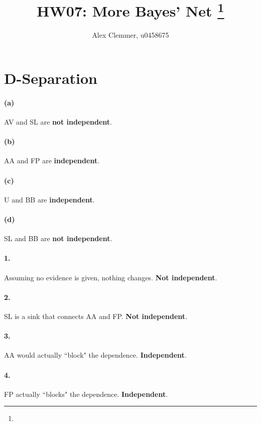 \documentclass[11pt]{article}
\title{HW07: More Bayes' Net
\footnote{\s{CS 5300 AI; \;\; Spring 2012 \hfill
Instructor: Jur van den Berg, University of Utah}
}
}
\author{Alex Clemmer, u0458675}
\begin{document}
\maketitle





\section{D-Separation}

\paragraph{(a)} AV and SL are \textbf{not independent}.

\paragraph{(b)} AA and FP are \textbf{independent}.

\paragraph{(c)} U and BB are \textbf{independent}.

\paragraph{(d)} SL and BB are \textbf{not independent}.


\paragraph{1.} Assuming no evidence is given, nothing changes. \textbf{Not independent}.

\paragraph{2.} SL is a sink that connects AA and FP. \textbf{Not independent}.

\paragraph{3.} AA would actually ``block" the dependence. \textbf{Independent}.

\paragraph{4.} FP actually ``blocks" the dependence. \textbf{Independent}.
\end{document}
